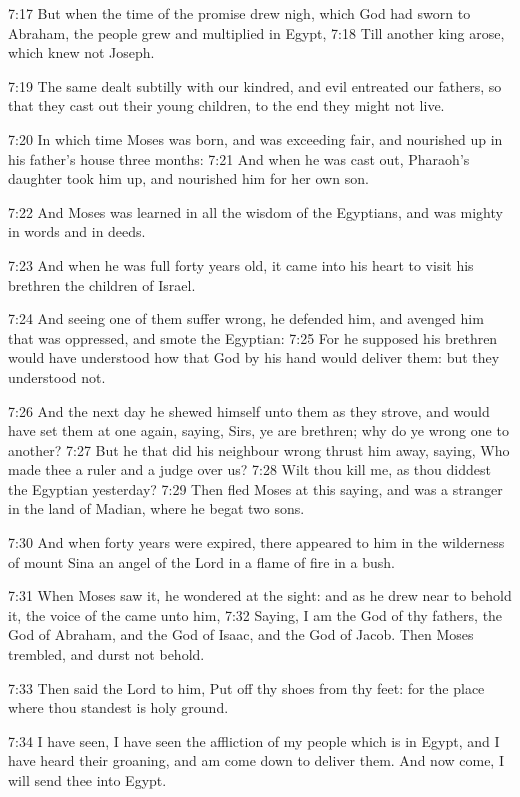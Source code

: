 7:17 But when the time of the promise drew nigh, which God had sworn to Abraham, the people grew and multiplied in Egypt, 7:18 Till another king arose, which knew not Joseph.

7:19 The same dealt subtilly with our kindred, and evil entreated our fathers, so that they cast out their young children, to the end they might not live.

7:20 In which time Moses was born, and was exceeding fair, and nourished up in his father's house three months: 7:21 And when he was cast out, Pharaoh's daughter took him up, and nourished him for her own son.

7:22 And Moses was learned in all the wisdom of the Egyptians, and was mighty in words and in deeds.

7:23 And when he was full forty years old, it came into his heart to visit his brethren the children of Israel.

7:24 And seeing one of them suffer wrong, he defended him, and avenged him that was oppressed, and smote the Egyptian: 7:25 For he supposed his brethren would have understood how that God by his hand would deliver them: but they understood not.

7:26 And the next day he shewed himself unto them as they strove, and would have set them at one again, saying, Sirs, ye are brethren; why do ye wrong one to another?  7:27 But he that did his neighbour wrong thrust him away, saying, Who made thee a ruler and a judge over us?  7:28 Wilt thou kill me, as thou diddest the Egyptian yesterday?  7:29 Then fled Moses at this saying, and was a stranger in the land of Madian, where he begat two sons.

7:30 And when forty years were expired, there appeared to him in the wilderness of mount Sina an angel of the Lord in a flame of fire in a bush.

7:31 When Moses saw it, he wondered at the sight: and as he drew near to behold it, the voice of the \LORD came unto him, 7:32 Saying, I am the God of thy fathers, the God of Abraham, and the God of Isaac, and the God of Jacob. Then Moses trembled, and durst not behold.

7:33 Then said the Lord to him, Put off thy shoes from thy feet: for the place where thou standest is holy ground.

7:34 I have seen, I have seen the affliction of my people which is in Egypt, and I have heard their groaning, and am come down to deliver them. And now come, I will send thee into Egypt.

